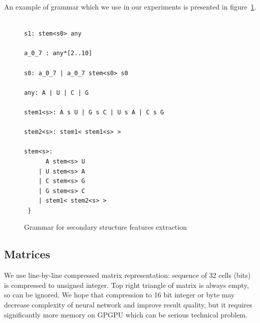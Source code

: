 \documentclass[a4paper,twoside]{article}
\begin{document}
\noindent An example of grammar which we use in our experiments is presented in figure~\ref{fig:grammar}.

\begin{figure}
\begin{verbatim}

s1: stem<s0> any

a_0_7 : any*[2..10]

s0: a_0_7 | a_0_7 stem<s0> s0

any: A | U | C | G

stem1<s>: A s U | G s C | U s A | C s G 

stem2<s>: stem1< stem1<s> >

stem<s>:  
      A stem<s> U 
    | U stem<s> A 
    | C stem<s> G 
    | G stem<s> C 
    | stem1< stem2<s> >  
 } 
\end{verbatim}
\caption{Grammar for secondary structure features extraction}
\label{fig:grammar}
\end{figure}

\subsection{Matrices}

\noindent We use line-by-line compressed matrix representation: sequence of 32 cells (bits) is compressed to unsigned integer. 
Top right triangle of matrix is always empty, so can be ignored. 
We hope that compression to 16 bit integer or byte may decrease complexity of neural network and improve result quality, but it requires significantly more memory on GPGPU which can be serious technical problem.


{\centering
  \
  \
  }
\end{document}
